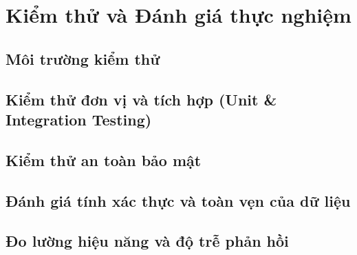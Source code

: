 \chapter{Kiểm thử và Đánh giá thực nghiệm}
\label{ch:evaluation}

\section{Môi trường kiểm thử}

\section{Kiểm thử đơn vị và tích hợp (Unit \& Integration Testing)}

\section{Kiểm thử an toàn bảo mật}

\section{Đánh giá tính xác thực và toàn vẹn của dữ liệu}

\section{Đo lường hiệu năng và độ trễ phản hồi}
